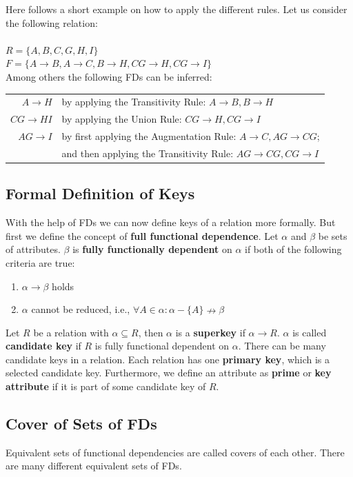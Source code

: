Here follows a short example on how to apply the different rules. 
Let us consider the following relation:\\ \\
\indent $R = \{A, B, C, G, H, I\}$ \\
\indent $F = \{A \rightarrow B, A \rightarrow C, B \rightarrow H, CG \rightarrow H, CG \rightarrow I\} $ \\

Among others the following FDs can be inferred:\\
\indent \begin{tabular}[h]{r l}
  $A \rightarrow H$ & by applying the Transitivity Rule: $A \rightarrow B, B \rightarrow H$ \\
  $CG \rightarrow HI$ & by  applying the Union Rule: $CG \rightarrow H, CG \rightarrow I$ \\
  $AG \rightarrow I$ & by first applying the Augmentation Rule: $A \rightarrow C, AG \rightarrow CG$; \\
  $ $ & and then applying the Transitivity Rule: $AG \rightarrow CG, CG \rightarrow I$
\end{tabular}

\subsection{Formal Definition of Keys}
With the help of FDs we can now define keys of a relation more formally. 
But first we define 
the concept of \textbf{full functional dependence}. 
Let $\alpha$ and $\beta$ be sets of attributes.
$\beta$ is \textbf{fully functionally dependent} on $\alpha$ if both of the following criteria are true:
\begin{enumerate}
  \item $\alpha \rightarrow \beta$ holds
  \item $\alpha$ cannot be reduced, i.e., $\forall A \in \alpha : \alpha - \{A\} \nrightarrow \beta$ 
\end{enumerate}
 
Let $R$ be a relation with $\alpha \subseteq R$, then $\alpha$ is a \textbf{superkey} if $\alpha \rightarrow R$. 
$\alpha$ is called \textbf{candidate key} if $R$ is fully functional dependent on $\alpha$. 
There can be many candidate keys in a relation. Each relation has one \textbf{primary key},
which is a selected candidate key. Furthermore, we define an attribute as \textbf{prime} or
\textbf{key attribute} if 
it is part of some candidate key of $R$. 

\subsection{Cover of Sets of FDs}
Equivalent sets of functional dependencies are called covers of each other.
There are many different equivalent sets of FDs. 

